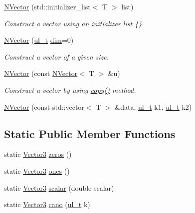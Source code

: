 \begin{DoxyCompactItemize}
\mbox{\hyperlink{class_vector3_a44c7b132c668c2aac890b66fe7ab0262}{N\+Vector}} (std\+::initializer\+\_\+list$<$ T $>$ list)
\begin{DoxyCompactList}\small\item\em Construct a vector using an initializer list {\ttfamily \{\}}. \end{DoxyCompactList}\item 
\mbox{\hyperlink{class_vector3_a58eee5f012e4e563d477788051fc7f1d}{N\+Vector}} (\mbox{\hyperlink{group___n_algebra_ga1b140a2034db3f5dfe18a987745df43a}{ul\+\_\+t}} \mbox{\hyperlink{class_n_vector_a7589027db20509ac4d93490bb9a1979a}{dim}}=0)
\begin{DoxyCompactList}\small\item\em Construct a vector of a given size. \end{DoxyCompactList}\item 
\mbox{\hyperlink{class_vector3_a7f648402b0fc9006ce9ced7ca647e600}{N\+Vector}} (const \mbox{\hyperlink{class_n_vector}{N\+Vector}}$<$ T $>$ \&u)
\begin{DoxyCompactList}\small\item\em Construct a vector by using {\ttfamily \mbox{\hyperlink{class_n_vector_a67128d2ff536b8ccd7a95cb680bd0431}{copy()}}} method. \end{DoxyCompactList}\item 
\mbox{\hyperlink{class_vector3_a402111a5a467efd5741e6a17fbd5c903}{N\+Vector}} (const std\+::vector$<$ T $>$ \&data, \mbox{\hyperlink{group___n_algebra_ga1b140a2034db3f5dfe18a987745df43a}{ul\+\_\+t}} k1, \mbox{\hyperlink{group___n_algebra_ga1b140a2034db3f5dfe18a987745df43a}{ul\+\_\+t}} k2)
\end{DoxyCompactItemize}
\subsection*{Static Public Member Functions}
\begin{DoxyCompactItemize}
\item 
static \mbox{\hyperlink{class_vector3}{Vector3}} \mbox{\hyperlink{class_vector3_adcaf5345746bf7d0f5da092faf8bf27b}{zeros}} ()
\item 
static \mbox{\hyperlink{class_vector3}{Vector3}} \mbox{\hyperlink{class_vector3_a7f32f3b57eb6adbec59af6025e6b7778}{ones}} ()
\item 
static \mbox{\hyperlink{class_vector3}{Vector3}} \mbox{\hyperlink{class_vector3_af757c4bd03bd4ddfa74c99fd5a3eee94}{scalar}} (double scalar)
\item 
static \mbox{\hyperlink{class_vector3}{Vector3}} \mbox{\hyperlink{class_vector3_a9b119e77ab2040283228425c1c738037}{cano}} (\mbox{\hyperlink{group___n_algebra_ga1b140a2034db3f5dfe18a987745df43a}{ul\+\_\+t}} k)
\end{DoxyCompactItemize}
